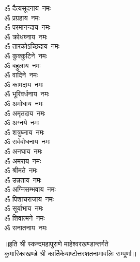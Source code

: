 \begin{multicols}{2}
\begin{flushleft}
ॐ दैत्यसूदनाय~नमः\\
ॐ प्रग्रहाय~नमः\\
ॐ परमानन्दाय~नमः\\
ॐ क्रोधघ्नाय~नमः\\
ॐ तारकोऽच्छिदाय~नमः\\
ॐ कुक्कुटिने~नमः\hfill{}\\
ॐ बहुलाय~नमः\\
ॐ वादिने~नमः\\
ॐ कामदाय~नमः\\
ॐ भूरिवर्धनाय~नमः\\
ॐ अमोघाय~नमः\\
ॐ अमृतदाय~नमः\\
ॐ अग्नये~नमः\\
ॐ शत्रुघ्नाय~नमः\\
ॐ सर्वबोधनाय~नमः\\
ॐ अनघाय~नमः\hfill{}\\
ॐ अमराय~नमः\\
ॐ श्रीमते~नमः\\
ॐ उन्नताय~नमः\\
ॐ अग्निसम्भवाय~नमः\\
ॐ पिशाचराजाय~नमः\\
ॐ सूर्याभाय~नमः\\
ॐ शिवात्मने~नमः\\
ॐ सनातनाय~नमः\\
\end{flushleft}
\end{multicols}
॥इति श्री स्कन्दमहापुराणे माहेश्वरखण्डान्तर्गते\\ कुमारिकाखण्डे श्री कार्तिकेयाष्टोत्तरशतनामावलिः सम्पूर्णा॥
